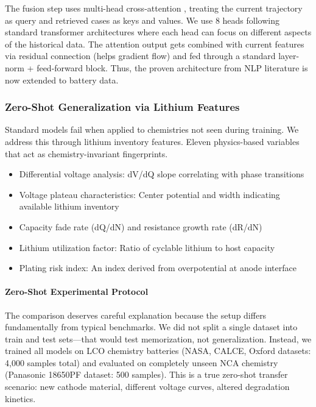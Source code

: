 \documentclass[5p,times,authoryear]{elsarticle}
\begin{document}
The fusion step uses multi-head cross-attention \citep{vaswani2017attention}, treating the current trajectory as query and retrieved cases as keys and values. We use 8 heads following standard transformer architectures where each head can focus on different aspects of the historical data. The attention output gets combined with current features via residual connection (helps gradient flow) and fed through a standard layer-norm + feed-forward block. Thus, the proven architecture from NLP literature is now extended to battery data.

\subsubsection{Zero-Shot Generalization via Lithium Features}

Standard models fail when applied to chemistries not seen during training. We address this through lithium inventory features. Eleven physics-based variables that act as chemistry-invariant fingerprints.

\begin{itemize}
    \item Differential voltage analysis: dV/dQ slope correlating with phase transitions \citep{bloom2005differential}
    \item Voltage plateau characteristics: Center potential and width indicating available lithium inventory \citep{dubarry2017synthesize}
    \item Capacity fade rate (dQ/dN) and resistance growth rate (dR/dN) \citep{vetter2005ageing}
    \item Lithium utilization factor: Ratio of cyclable lithium to host capacity \citep{birkl2017degradation}
    \item Plating risk index: An index derived from overpotential at anode interface \citep{waldmann2014temperature}
\end{itemize}






\paragraph{Zero-Shot Experimental Protocol}

The comparison deserves careful explanation because the setup differs fundamentally from typical benchmarks. We did not split a single dataset into train and test sets---that would test memorization, not generalization. Instead, we trained all models on LCO chemistry batteries (NASA, CALCE, Oxford datasets: 4,000 samples total) and evaluated on completely unseen NCA chemistry (Panasonic 18650PF dataset: 500 samples). This is a true zero-shot transfer scenario: new cathode material, different voltage curves, altered degradation kinetics.
\end{document}
